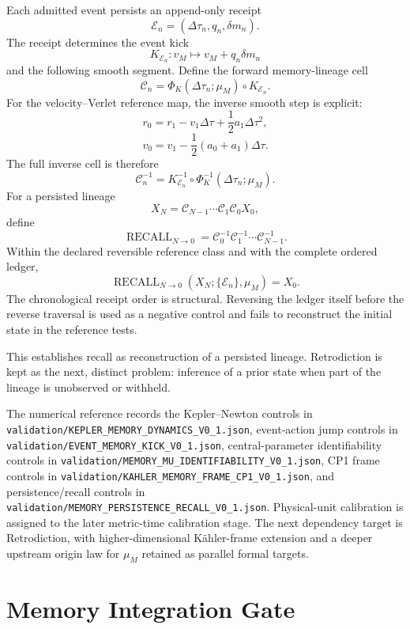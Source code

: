 Each admitted event persists an append-only receipt
\[
\boxed{
\mathcal E_n=(\Delta\tau_n,q_n,\delta m_n).
}
\]
The receipt determines the event kick
\[
K_{\mathcal E_n}:v_M\mapsto v_M+q_n\delta m_n
\]
and the following smooth segment. Define the forward memory-lineage cell
\[
\boxed{
\mathcal C_n
=\Phi_K(\Delta\tau_n;\mu_M)\circ K_{\mathcal E_n}.
}
\]
For the velocity--Verlet reference map, the inverse smooth step is explicit:
\[
\boxed{
r_0=r_1-v_1\Delta\tau+\frac12a_1\Delta\tau^2,
}
\]
\[
\boxed{
v_0=v_1-\frac12(a_0+a_1)\Delta\tau.
}
\]
The full inverse cell is therefore
\[
\boxed{
\mathcal C_n^{-1}
=K_{\mathcal E_n}^{-1}\circ\Phi_K^{-1}(\Delta\tau_n;\mu_M).
}
\]
For a persisted lineage
\[
X_N=\mathcal C_{N-1}\cdots\mathcal C_1\mathcal C_0X_0,
\]
define
\[
\boxed{
\operatorname{RECALL}_{N\to0}
=\mathcal C_0^{-1}\mathcal C_1^{-1}\cdots\mathcal C_{N-1}^{-1}.
}
\]
Within the declared reversible reference class and with the complete ordered ledger,
\[
\boxed{
\operatorname{RECALL}_{N\to0}(X_N;\{\mathcal E_n\},\mu_M)=X_0.
}
\]
The chronological receipt order is structural. Reversing the ledger itself before the reverse traversal is used as a negative control and fails to reconstruct the initial state in the reference tests.

This establishes recall as reconstruction of a persisted lineage. Retrodiction is kept as the next, distinct problem: inference of a prior state when part of the lineage is unobserved or withheld.

The numerical reference records the Kepler--Newton controls in \texttt{validation/KEPLER\_MEMORY\_DYNAMICS\_V0\_1.json}, event-action jump controls in \texttt{validation/EVENT\_MEMORY\_KICK\_V0\_1.json}, central-parameter identifiability controls in \texttt{validation/MEMORY\_MU\_IDENTIFIABILITY\_V0\_1.json}, CP1 frame controls in \texttt{validation/KAHLER\_MEMORY\_FRAME\_CP1\_V0\_1.json}, and persistence/recall controls in \texttt{validation/MEMORY\_PERSISTENCE\_RECALL\_V0\_1.json}. Physical-unit calibration is assigned to the later metric-time calibration stage. The next dependency target is Retrodiction, with higher-dimensional K\"ahler-frame extension and a deeper upstream origin law for \(\mu_M\) retained as parallel formal targets.


\chapter{Memory Integration Gate}

